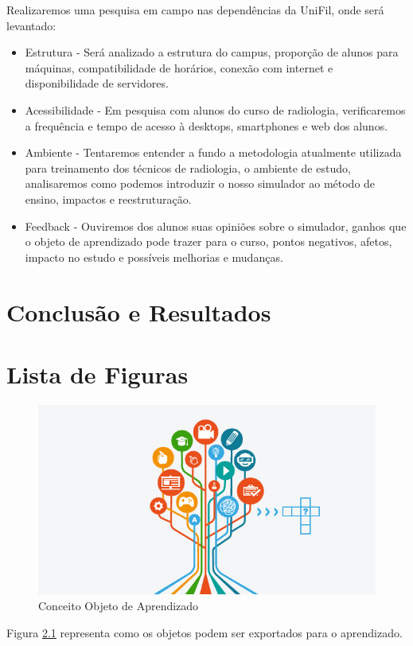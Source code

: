 \documentclass[12pt,openright,oneside,a4paper,english,french,spanish,brazil]{unifil}
\begin{document}
Realizaremos uma pesquisa em campo nas dependências da UniFil, onde será levantado:
\begin{itemize}
\item Estrutura - Será analizado a estrutura do campus, proporção de alunos para máquinas, compatibilidade de horários, conexão com internet e disponibilidade de servidores.
\item Acessibilidade - Em pesquisa com alunos do curso de radiologia, verificaremos a frequência e tempo de acesso à desktops, smartphones e web dos alunos.
\item Ambiente - Tentaremos entender a fundo a metodologia atualmente utilizada para treinamento dos técnicos de radiologia, o ambiente de estudo, analisaremos como podemos introduzir o nosso simulador ao método de ensino, impactos e reestruturação.
\item Feedback - Ouviremos dos alunos suas opiniões sobre o simulador, ganhos que o objeto de aprendizado pode trazer para o curso, pontos negativos, afetos, impacto no estudo e possíveis melhorias e mudanças.
\end{itemize}

\chapter {Conclusão e Resultados}

\chapter{Lista de Figuras}

\begin{figure}[htb]
	\centering
	\includegraphics[scale=0.5]{arvore.png}
	\caption{Conceito Objeto de Aprendizado}
	\label{img:arvore}
\end{figure}
Figura \ref{img:arvore} representa como os objetos podem ser exportados para o aprendizado.
\end{document}
